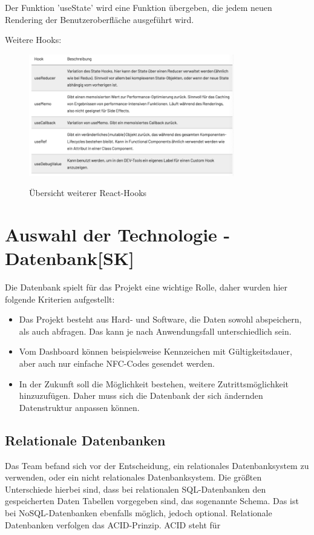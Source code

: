 Der Funktion 'useState' wird eine Funktion übergeben, die jedem neuen Rendering der Benutzeroberfläche ausgeführt wird.

Weitere Hooks:

\begin{figure}[H]
  \centering
  \includegraphics[width=0.8\textwidth]{pics/rHooks.png}
  \caption{Übersicht weiterer React-Hooks}
  \cite{hooks}
\end{figure}

\section{Auswahl der Technologie - Datenbank[SK]}
Die Datenbank spielt für das Projekt eine wichtige Rolle, daher wurden hier folgende Kriterien aufgestellt:

\begin{itemize}
  \item Das Projekt besteht aus Hard- und Software, die Daten sowohl abspeichern, als auch abfragen. Das kann je nach Anwendungsfall unterschiedlich sein.
  \item Vom Dashboard können beispielsweise Kennzeichen mit Gültigkeitsdauer, aber auch nur einfache NFC-Codes gesendet werden.
  \item In der Zukunft soll die Möglichkeit bestehen, weitere Zutrittsmöglichkeit hinzuzufügen. Daher muss sich die Datenbank der sich ändernden Datenstruktur anpassen können.
\end{itemize}

\subsection{Relationale Datenbanken}

Das Team befand sich vor der Entscheidung, ein relationales Datenbanksystem zu verwenden, oder ein nicht relationales Datenbanksystem.
Die größten Unterschiede hierbei sind, dass bei relationalen SQL-Datenbanken den gespeicherten Daten Tabellen vorgegeben sind, das sogenannte Schema. Das ist bei NoSQL-Datenbanken ebenfalls möglich, jedoch optional.
Relationale Datenbanken verfolgen das ACID-Prinzip. ACID steht für

